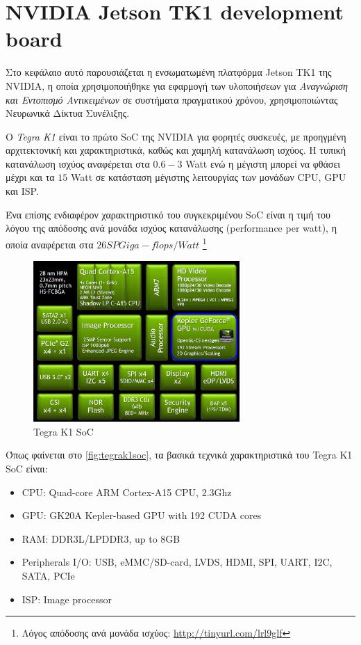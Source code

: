\section{NVIDIA Jetson TK1 development board}
\label{sec:jetson_tk1}

Στο κεφάλαιο αυτό παρουσιάζεται η ενσωματωμένη πλατφόρμα Jetson TK1 της NVIDIA,
η οποία χρησιμοποιήθηκε για εφαρμογή των υλοποιήσεων για
\emph{Αναγνώριση και Εντοπισμό Αντικειμένων} σε συστήματα πραγματικού χρόνου,
χρησιμοποιώντας Νευρωνικά Δίκτυα Συνέλιξης.

Ο \emph{Tegra K1} είναι το πρώτο SoC της NVIDIA για φορητές συσκευές, με προηγμένη αρχιτεκτονική
και χαρακτηριστικά, καθώς και χαμηλή κατανάλωση ισχύος. Η τυπική κατανάλωση
ισχύος αναφέρεται στα $0.6 - 3$ Watt ενώ η μέγιστη μπορεί να φθάσει μέχρι και τα
$15$ Watt σε κατάσταση μέγιστης λειτουργίας των μονάδων CPU, GPU και ISP.

Ένα επίσης ενδιαφέρον χαρακτηριστικό του συγκεκριμένου SoC είναι η τιμή του
λόγου της απόδοσης ανά μονάδα ισχύος κατανάλωσης (performance per watt),
η οποία αναφέρεται στα $26SP Giga-flops/Watt$
\footnote{Λόγος απόδοσης ανά μονάδα ισχύος: \url{http://tinyurl.com/lrl9glf}}


\begin{figure}[!ht]
  \centering
  \includegraphics[width=0.7\textwidth]{./images/chapter4/nvidia_tegrak1_block2.jpg}
  \caption{Tegra K1 SoC}
  \label{fig:tegrak1soc}
\end{figure}
\noindent

Όπως φαίνεται στο \autoref{fig:tegrak1soc}, τα βασικά τεχνικά χαρακτηριστικά του Tegra K1 SoC είναι:
\begin{itemize}
  \item{CPU: Quad-core ARM Cortex-A15 CPU, 2.3Ghz}
  \item{GPU: GK20A Kepler-based GPU with 192 CUDA cores}
  \item{RAM: DDR3L/LPDDR3, up to 8GB}
  \item{Peripherals I/O: USB, eMMC/SD-card, LVDS, HDMI, SPI, UART, I2C, SATA, PCIe}
  \item{ISP: Image processor}
\end{itemize}

